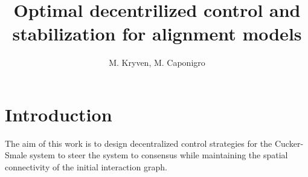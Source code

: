 \documentclass[a4paper, english]{article}
\begin{document}
\title{Optimal decentrilized control and stabilization for alignment models}
\author{M. Kryven, M. Caponigro}
\maketitle








\section{Introduction}
The aim of this work is to design  decentralized control strategies for the Cucker-Smale system to steer the system to consensus while maintaining the spatial connectivity of the initial interaction graph.
\end{document}
